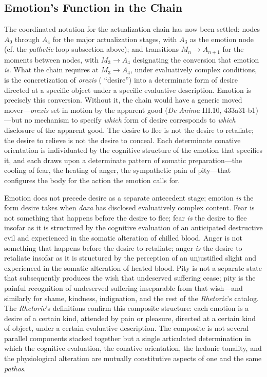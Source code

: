 \subsection{Emotion's Function in the Chain}

The coordinated notation for the actualization chain has now been settled: nodes $A_0$ through $A_4$ for the major actualization stages, with $A_3$ as the emotion node (cf. the \textit{pathetic} loop subsection above); and transitions $M_n \rightarrow A_{n+1}$ for the moments between nodes, with $M_3 \rightarrow A_4$ designating the conversion that emotion \textit{is}. What the chain requires at $M_3 \rightarrow A_4$, under evaluatively complex conditions, is the concretization of \textit{orexis} ( ``desire'') into a determinate form of desire directed at a specific object under a specific evaluative description. Emotion is precisely this conversion. Without it, the chain would have a generic moved mover---\textit{orexis} set in motion by the apparent good (\textit{De Anima} III.10, 433a31-b1)---but no mechanism to specify \textit{which} form of desire corresponds to \textit{which} disclosure of the apparent good. The desire to flee is not the desire to retaliate; the desire to relieve is not the desire to conceal. Each determinate conative orientation is individuated by the cognitive structure of the emotion that specifies it, and each draws upon a determinate pattern of somatic preparation---the cooling of fear, the heating of anger, the sympathetic pain of pity---that configures the body for the action the emotion calls for.

Emotion does not precede desire as a separate antecedent stage; emotion \textit{is} the form desire takes when \textit{doxa} has disclosed evaluatively complex content. Fear is not something that happens before the desire to flee; fear \textit{is} the desire to flee insofar as it is structured by the cognitive evaluation of an anticipated destructive evil and experienced in the somatic alteration of chilled blood. Anger is not something that happens before the desire to retaliate; anger \textit{is} the desire to retaliate insofar as it is structured by the perception of an unjustified slight and experienced in the somatic alteration of heated blood. Pity is not a separate state that subsequently produces the wish that undeserved suffering cease; pity is the painful recognition of undeserved suffering inseparable from that wish---and similarly for shame, kindness, indignation, and the rest of the \textit{Rhetoric}'s catalog. The \textit{Rhetoric}'s definitions confirm this composite structure: each emotion is a desire of a certain kind, attended by pain or pleasure, directed at a certain kind of object, under a certain evaluative description. The composite is not several parallel components stacked together but a single articulated determination in which the cognitive evaluation, the conative orientation, the hedonic tonality, and the physiological alteration are mutually constitutive aspects of one and the same \textit{pathos}. 

